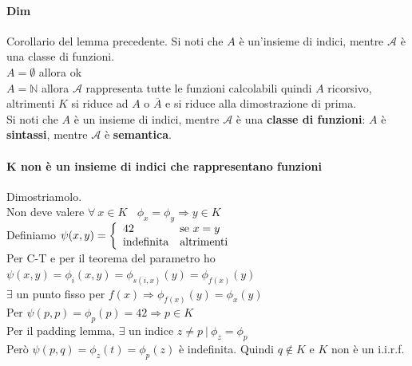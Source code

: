 \documentclass[10pt]{book}
\begin{document}
\paragraph{Dim} Corollario del lemma precedente. Si noti che $A$ è un'insieme di indici, mentre $\mathscr{A}$ è una classe di funzioni.\\
$A = \emptyset$ allora ok\\
$A = \mathbb{N}$ allora $\mathscr{A}$ rappresenta tutte le funzioni calcolabili quindi $A$ ricorsivo, altrimenti $K$ si riduce ad $A$ o $\overline{A}$ e si riduce alla dimostrazione di prima.\\
Si noti che $A$ è un insieme di indici, mentre $\mathscr{A}$ è una \textbf{classe di funzioni}: $A$ è \textbf{sintassi}, mentre $\mathscr{A}$ è \textbf{semantica}.
\paragraph{K non è un insieme di indici che rappresentano funzioni} Dimostriamolo.\\ Non deve valere $\forall\:x\in K\:\:\:\:\phi_x = \phi_y \Rightarrow y \in K$\\
Definiamo $\psi(x, y) = \left\{\begin{array}{l l}
	42 & \text{se }x = y\\
	\text{indefinita} & \text{altrimenti}
\end{array} \right.$\\Per C-T e per il teorema del parametro ho $\psi(x, y) = \phi_i(x, y) = \phi_{s(i,x)}(y) = \phi_{f(x)}(y)$\\
$\exists$ un punto fisso per $f(x) \Rightarrow \phi_{f(x)}(y) = \phi_x(y)$\\
Per $\psi(p,p) = \phi_p(p) = 42 \Rightarrow p\in K$\\
Per il padding lemma, $\exists$ un indice $z \neq p\:|\:\phi_z = \phi_p$\\
Però $\psi(p,q) = \phi_z(t) = \phi_p(z)$ è indefinita. Quindi $q\not\in K$ e $K$ non è un i.i.r.f.
\end{document}
